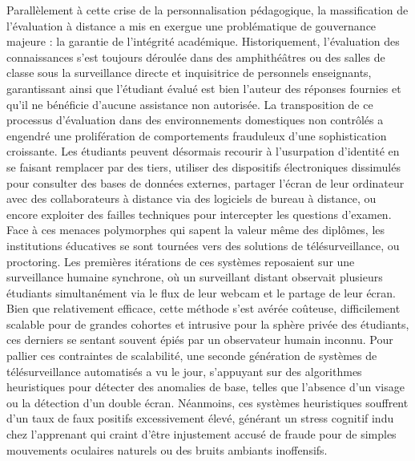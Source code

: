 Parallèlement à cette crise de la personnalisation pédagogique, la massification de l'évaluation à distance a mis en exergue une problématique de gouvernance majeure : la garantie de l'intégrité académique. Historiquement, l'évaluation des connaissances s'est toujours déroulée dans des amphithéâtres ou des salles de classe sous la surveillance directe et inquisitrice de personnels enseignants, garantissant ainsi que l'étudiant évalué est bien l'auteur des réponses fournies et qu'il ne bénéficie d'aucune assistance non autorisée. La transposition de ce processus d'évaluation dans des environnements domestiques non contrôlés a engendré une prolifération de comportements frauduleux d'une sophistication croissante. Les étudiants peuvent désormais recourir à l'usurpation d'identité en se faisant remplacer par des tiers, utiliser des dispositifs électroniques dissimulés pour consulter des bases de données externes, partager l'écran de leur ordinateur avec des collaborateurs à distance via des logiciels de bureau à distance, ou encore exploiter des failles techniques pour intercepter les questions d'examen. Face à ces menaces polymorphes qui sapent la valeur même des diplômes, les institutions éducatives se sont tournées vers des solutions de télésurveillance, ou proctoring. Les premières itérations de ces systèmes reposaient sur une surveillance humaine synchrone, où un surveillant distant observait plusieurs étudiants simultanément via le flux de leur webcam et le partage de leur écran. Bien que relativement efficace, cette méthode s'est avérée coûteuse, difficilement scalable pour de grandes cohortes et intrusive pour la sphère privée des étudiants, ces derniers se sentant souvent épiés par un observateur humain inconnu. Pour pallier ces contraintes de scalabilité, une seconde génération de systèmes de télésurveillance automatisés a vu le jour, s'appuyant sur des algorithmes heuristiques pour détecter des anomalies de base, telles que l'absence d'un visage ou la détection d'un double écran. Néanmoins, ces systèmes heuristiques souffrent d'un taux de faux positifs excessivement élevé, générant un stress cognitif indu chez l'apprenant qui craint d'être injustement accusé de fraude pour de simples mouvements oculaires naturels ou des bruits ambiants inoffensifs.

